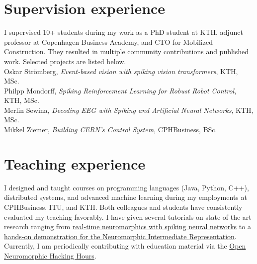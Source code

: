 \documentclass[11pt, a4paper]{article}
\newcommand{\years}[1]{\marginnote{\scriptsize #1}}
\begin{document}
\section*{Supervision experience}
I supervised 10+ students during my work as a PhD student at KTH, adjunct professor at Copenhagen Business Academy, and CTO for Mobilized Construction.
They resulted in multiple community contributions and published work.
Selected projects are listed below. \\
\years{2024}Oskar Strömberg, \emph{Event-based vision with spiking vision transformers}, KTH, MSc. \\
\years{2022}Philpp Mondorff, \emph{Spiking Reinforcement Learning for Robust Robot Control}, KTH, MSc.\\
\years{2022}Merlin Sewina, \emph{Decoding EEG with Spiking and Artificial Neural Networks}, KTH, MSc.\\
\years{2020}Mikkel Ziemer, \emph{Building CERN's Control System}, CPHBusiness, BSc.

\section*{Teaching experience}
I designed and taught courses on programming languages (Java, Python, C++), distributed systems, and advanced machine learning during my employments at CPHBusiness, ITU, and KTH.
Both colleagues and students have consistently evaluated my teaching favorably.
I have given several tutorials on state-of-the-art research ranging from \href{https://uzh.mediaspace.cast.switch.ch/media/NEUROTECH+TutorialA+Real-time+neuromorphics+with+Norse/0_hynhzm4b/12519}{real-time neuromorphics with spiking neural networks} to a \href{https://www.youtube.com/watch?v=A96rInDg8zo}{hands-on demonstration for the Neuromorphic Intermediate Representation}.
Currently, I am periodically contributing with education material via the \href{https://www.youtube.com/@hackinghours}{Open Neuromorphic Hacking Hours}.

\vspace{-0.2cm}
\end{document}
